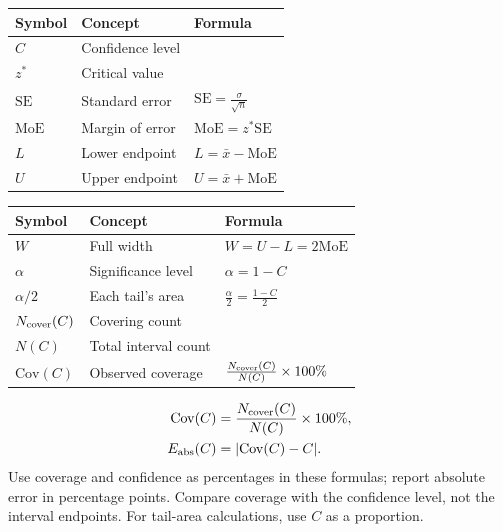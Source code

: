 \begingroup
\small
\setlength{\tabcolsep}{3pt}
\setlength{\extrarowheight}{0pt}
\setlength{\parskip}{0pt}
\renewcommand{\arraystretch}{1}
\noindent\begin{minipage}[t]{.49\linewidth}
\vspace{0pt}
\begin{tabularx}{\linewidth}{@{}>{\raggedright\arraybackslash}p{.21\linewidth}>{\raggedright\arraybackslash}p{.34\linewidth}>{\raggedright\arraybackslash}X@{}}
\toprule
\textbf{Symbol} & \textbf{Concept} & \textbf{Formula} \\
\midrule
$C$ & Confidence level & \\
$z^*$ & Critical value & \\
$\mathrm{SE}$ & Standard error & $\mathrm{SE}=\frac{\sigma}{\sqrt n}$ \\
$\mathrm{MoE}$ & Margin of error & $\mathrm{MoE}=z^*\mathrm{SE}$ \\
$L$ & Lower endpoint & $L=\bar{x}-\mathrm{MoE}$ \\
$U$ & Upper endpoint & $U=\bar{x}+\mathrm{MoE}$ \\
\bottomrule
\end{tabularx}\par
\end{minipage}\hfill
\begin{minipage}[t]{.49\linewidth}
\vspace{0pt}
\begin{tabularx}{\linewidth}{@{}>{\raggedright\arraybackslash}p{.21\linewidth}>{\raggedright\arraybackslash}p{.34\linewidth}>{\raggedright\arraybackslash}X@{}}
\toprule
\textbf{Symbol} & \textbf{Concept} & \textbf{Formula} \\
\midrule
$W$ & Full width & $W=U-L=2\mathrm{MoE}$ \\
$\alpha$ & Significance level & $\alpha=1-C$ \\
$\alpha/2$ & Each tail's area & $\frac{\alpha}{2}=\frac{1-C}{2}$ \\
$N_{\rm cover}(C)$ & Covering count & \\
$N(C)$ & Total interval count & \\
$\mathrm{Cov}(C)$ & Observed coverage & $\frac{N_{\rm cover}(C)}{N(C)}\times100\%$ \\
\bottomrule
\end{tabularx}\par
\end{minipage}\par
\endgroup
\noindent\begin{minipage}[t]{0.68\linewidth}
\vspace{0pt}
\[
\begin{aligned}
\mathrm{Cov}(C)&=\frac{N_{\rm cover}(C)}{N(C)}\times100\%,\\
E_{\rm abs}(C)&=|\mathrm{Cov}(C)-C|.
\end{aligned}
\]
Use coverage and confidence as percentages in these formulas; report absolute error in percentage points. Compare coverage with the confidence level, not the interval endpoints. For tail-area calculations, use $C$ as a proportion.
\end{minipage}\hfill
